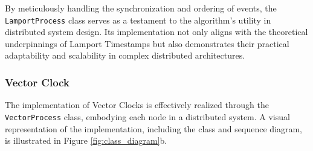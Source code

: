 \documentclass{article}
\begin{document}
    By meticulously handling the synchronization and ordering of events, the \texttt{LamportProcess} class serves as a testament to the algorithm's utility in distributed system design. Its implementation not only aligns with the theoretical underpinnings of Lamport Timestamps but also demonstrates their practical adaptability and scalability in complex distributed architectures.

    \subsubsection{Vector Clock}
      The implementation of Vector Clocks is effectively realized through the \texttt{VectorProcess} class, embodying each node in a distributed system. A visual representation of the implementation, including the class and sequence diagram, is illustrated in Figure \ref*{fig:class_diagram}b.
      
\end{document}
